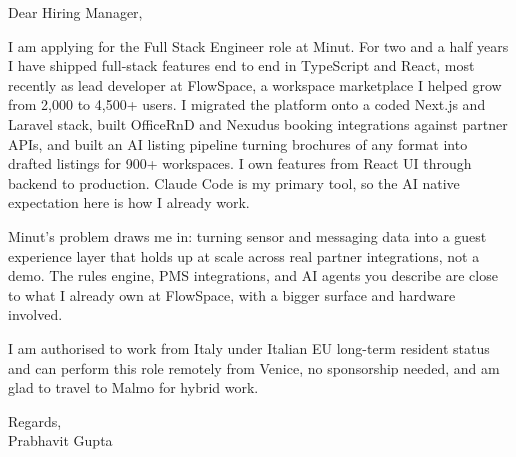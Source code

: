\documentclass[a4paper,11pt]{article}
\begin{document}
Dear Hiring Manager,

I am applying for the Full Stack Engineer role at Minut. For two and a half years I have shipped full-stack features end to end in TypeScript and React, most recently as lead developer at FlowSpace, a workspace marketplace I helped grow from 2,000 to 4,500+ users. I migrated the platform onto a coded Next.js and Laravel stack, built OfficeRnD and Nexudus booking integrations against partner APIs, and built an AI listing pipeline turning brochures of any format into drafted listings for 900+ workspaces. I own features from React UI through backend to production. Claude Code is my primary tool, so the AI native expectation here is how I already work.

Minut's problem draws me in: turning sensor and messaging data into a guest experience layer that holds up at scale across real partner integrations, not a demo. The rules engine, PMS integrations, and AI agents you describe are close to what I already own at FlowSpace, with a bigger surface and hardware involved.

I am authorised to work from Italy under Italian EU long-term resident status and can perform this role remotely from Venice, no sponsorship needed, and am glad to travel to Malmo for hybrid work.

Regards,\\
Prabhavit Gupta
\end{document}
